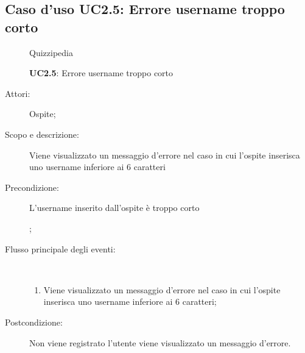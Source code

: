 \subsection{Caso d'uso UC2.5: Errore username troppo corto}
	\begin{figure}[H]
		\centering
		\begin{resizedtikzpicture}{\textwidth}
		\begin{umlsystem}[x=0, fill=lightgray!20]{Quizzipedia}
		\end{umlsystem}
		\end{resizedtikzpicture}
		\caption{\textbf{UC2.5}: Errore username troppo corto}
		\label{UC2.5}
	\end{figure}
\begin{description}
\item[Attori:] Ospite;
\item[Scopo e descrizione:] Viene visualizzato un messaggio d'errore nel caso in cui l'ospite inserisca uno username inferiore ai 6 caratteri
      \item[Precondizione:] L'username inserito dall'ospite è troppo corto

;

        \item[Flusso principale degli eventi:] \ 
 \begin{enumerate}
          \item Viene visualizzato un messaggio d'errore nel caso in cui l'ospite inserisca uno username inferiore ai 6 caratteri;

      \end{enumerate}
    \item[Postcondizione:] Non viene registrato l'utente viene visualizzato un messaggio d'errore.
  \end{description}
\hypertarget{UC2.6}{}
